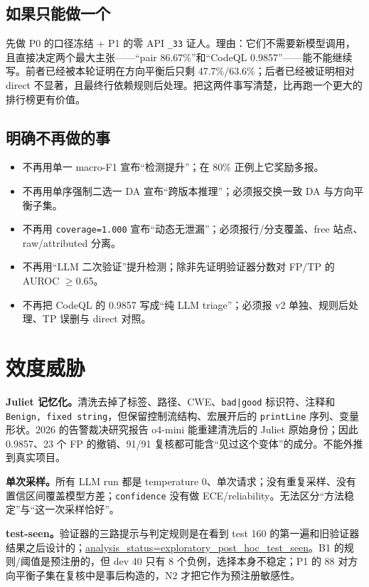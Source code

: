 \documentclass[conference]{IEEEtran}
\begin{document}
\subsection{如果只能做一个}

先做 P0 的口径冻结 + P1 的零 API \texttt{\_33} 证人。理由：它们不需要新模型调用，且直接决定两个最大主张——“pair 86.67\%”和“CodeQL 0.9857”——能不能继续写。前者已经被本轮证明在方向平衡后只剩 47.7\%/63.6\%；后者已经被证明相对 direct 不显著，且最终行依赖规则后处理。把这两件事写清楚，比再跑一个更大的排行榜更有价值。

\subsection{明确不再做的事}

\begin{itemize}
  \item 不再用单一 macro-F1 宣布“检测提升”；在 80\% 正例上它奖励多报。
  \item 不再用单序强制二选一 DA 宣布“跨版本推理”；必须报交换一致 DA 与方向平衡子集。
  \item 不再用 \texttt{coverage=1.000} 宣布“动态无泄漏”；必须报行/分支覆盖、free 站点、raw/attributed 分离。
  \item 不再用“LLM 二次验证”提升检测；除非先证明验证器分数对 FP/TP 的 AUROC $\ge$0.65。
  \item 不再把 CodeQL 的 0.9857 写成“纯 LLM triage”；必须报 v2 单独、规则后处理、TP 误删与 direct 对照。
\end{itemize}

\section{效度威胁}
\label{sec:threats}

\textbf{Juliet 记忆化。}清洗去掉了标签、路径、CWE、\texttt{bad|good} 标识符、注释和 \texttt{Benign, fixed string}，但保留控制流结构、宏展开后的 \texttt{printLine} 序列、变量形状。2026 的告警裁决研究报告 o4-mini 能重建清洗后的 Juliet 原始身份；因此 0.9857、23 个 FP 的撤销、91/91 复核都可能含“见过这个变体”的成分。不能外推到真实项目。

\textbf{单次采样。}所有 LLM run 都是 temperature 0、单次请求；没有重复采样、没有置信区间覆盖模型方差；\texttt{confidence} 没有做 ECE/reliability。无法区分“方法稳定”与“这一次采样恰好”。

\textbf{test-seen。}验证器的三路提示与判定规则是在看到 test 160 的第一遍和旧验证器结果之后设计的；\url{analysis_status=exploratory_post_hoc_test_seen}。B1 的规则/阈值是预注册的，但 dev 40 只有 8 个负例，选择本身不稳定；P1 的 88 对方向平衡子集在复核中是事后构造的，N2 才把它作为预注册敏感性。
\end{document}
